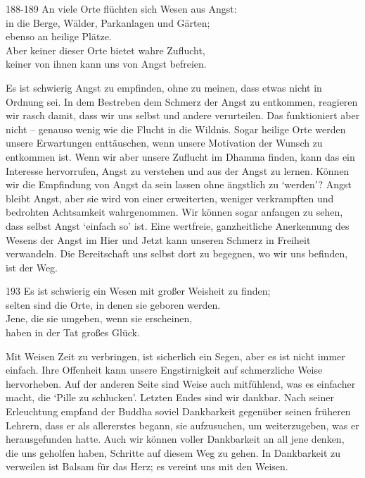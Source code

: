 
\begin{dhpVerse}{188-189}
\label{dhp-188}\label{dhp-189}
An viele Orte flüchten sich Wesen aus Angst:\\ 
in die Berge, Wälder, Parkanlagen und Gärten;\\ 
ebenso an heilige Plätze.\\ 
Aber keiner dieser Orte bietet wahre Zuflucht,\\ 
keiner von ihnen kann uns von Angst befreien. 
\end{dhpVerse}

\begin{dhpRefl}

Es ist schwierig Angst zu empfinden, ohne zu meinen, dass etwas nicht in
Ordnung sei. In dem Bestreben dem Schmerz der Angst zu entkommen, reagieren
wir rasch damit, dass wir uns selbst und andere verurteilen. Das funktioniert
aber nicht -- genauso wenig wie die Flucht in die Wildnis. Sogar heilige Orte
werden unsere Erwartungen enttäuschen, wenn unsere Motivation der Wunsch zu
entkommen ist. Wenn wir aber unsere Zuflucht im Dhamma finden, kann das ein
Interesse hervorrufen, Angst zu verstehen und aus der Angst zu lernen. Können
wir die Empfindung von Angst da sein lassen ohne ängstlich zu `werden'? Angst
bleibt Angst, aber sie wird von einer erweiterten, weniger verkrampften und
bedrohten Achtsamkeit wahrgenommen. Wir können sogar anfangen zu sehen, dass
selbst Angst `einfach so' ist. Eine wertfreie, ganzheitliche Anerkennung des
Wesens der Angst im Hier und Jetzt kann unseren Schmerz in Freiheit
verwandeln. Die Bereitschaft uns selbst dort zu begegnen, wo wir uns befinden,
ist der Weg.

\end{dhpRefl}


\begin{dhpVerse}{193}
\label{dhp-193}
Es ist schwierig ein Wesen mit großer Weisheit zu finden;\\ 
selten sind die Orte, in denen sie geboren werden.\\ 
Jene, die sie umgeben, wenn sie erscheinen,\\ 
haben in der Tat großes Glück. 
\end{dhpVerse}

\begin{dhpRefl}

Mit Weisen Zeit zu verbringen, ist sicherlich ein Segen, aber es ist nicht
immer einfach. Ihre Offenheit kann unsere Engstirnigkeit auf schmerzliche
Weise hervorheben. Auf der anderen Seite sind Weise auch mitfühlend, was es
einfacher macht, die `Pille zu schlucken'. Letzten Endes sind wir dankbar.
Nach seiner Erleuchtung empfand der Buddha soviel Dankbarkeit gegenüber seinen
früheren Lehrern, dass er als allererstes begann, sie aufzusuchen, um
weiterzugeben, was er herausgefunden hatte. Auch wir können voller Dankbarkeit
an all jene denken, die uns geholfen haben, Schritte auf diesem Weg zu gehen.
In Dankbarkeit zu verweilen ist Balsam für das Herz; es vereint uns mit den
Weisen.

\end{dhpRefl}

